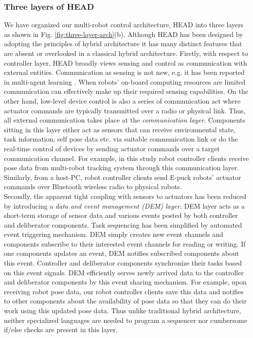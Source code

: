 \subsubsection*{Three layers of HEAD}
We have organized our multi-robot control architecture, HEAD into three layers as shown in Fig. \ref{fig:three-layer-arch}(b). Although HEAD has been designed by adopting the principles of hybrid architecture it has many distinct features that are absent or overlooked in a classical hybrid architecture. Firstly, with respect to controller layer, HEAD broadly views sensing and control as communication with external entities. Communication as sensing is not new, e.g. it has been reported in multi-agent learning \cite{Mataric1998}. When robots' on-board computing resources are limited communication can effectively make up their required sensing capabilities. On the other hand, low-level device control is also a series of communication act where actuator commands are typically transmitted over a radio or physical link. Thus, all external communication takes place at the {\em communication layer}. Components sitting in this layer either act as sensors that can receive environmental state, task information, self pose data etc. via suitable communication link or do the real-time control of devices by sending actuator commands over a target communication channel. For example, in this study robot controller clients receive pose data from multi-robot tracking system through this communication layer.  Similarly, from a host-PC, robot controller clients send E-puck robots' actuator commands over Bluetooth wireless radio to physical robots.\\
Secondly, the apparent tight coupling with sensors to actuators has been reduced by introducing a {\em data and event management (DEM) layer}. DEM layer acts as a short-term storage of sensor data and various events posted by both controller and deliberator components. Task sequencing has been simplified by automated event triggering mechanism. DEM simply creates new event channels and components subscribe to their interested event channels for reading or writing. If one components updates an event, DEM notifies subscribed components about this event. Controller and deliberator components synchronize their tasks based on this event signals. DEM efficiently serves newly arrived data to the controller and deliberator components by this event sharing mechanism. For example, upon receiving robot pose data, our robot controller clients save this data and notifies to other components about the availability of pose data so that they can do their work using this updated pose data. Thus unlike traditional hybrid architecture, neither specialized languages are needed to program a sequencer nor cumbersome if/else checks are present in this layer.\\
